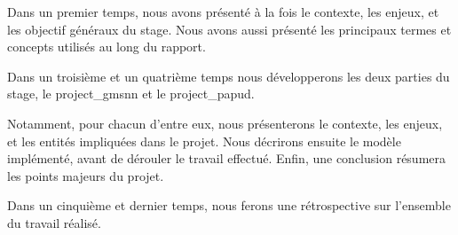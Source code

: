 

Dans un premier temps, nous avons présenté à la fois le contexte, les enjeux, et les objectif généraux du stage. Nous avons aussi présenté les principaux termes et concepts utilisés au long du rapport.


Dans un troisième et un quatrième temps nous développerons les deux parties du stage, le \gls{project_gmsnn} et le \gls{project_papud}.

Notamment, pour chacun d'entre eux, nous présenterons le contexte, les enjeux, et les entités impliquées dans le projet. Nous décrirons ensuite le modèle implémenté, avant de dérouler le travail effectué. Enfin, une conclusion résumera les points majeurs du projet.

Dans un cinquième et dernier temps, nous ferons une rétrospective sur l'ensemble du travail réalisé.




